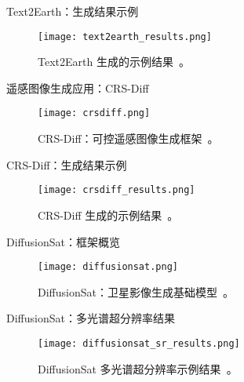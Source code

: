 \begin{refsection}
  \begin{frame}{Text2Earth：生成结果示例}
    \begin{figure}
      \centering
      \texttt{[image: text2earth\_results.png]}
      \caption[]{\scriptsize Text2Earth 生成的示例结果~\parencite{text2earth2025}。}
    \end{figure}
    \bottomleftrefs
  \end{frame}
\end{refsection}

\begin{refsection}
\begin{frame}{遥感图像生成应用：CRS-Diff}
  \begin{figure}
    \centering
    \texttt{[image: crsdiff.png]}
    \caption[]{\scriptsize CRS-Diff：可控遥感图像生成框架~\parencite{tang2024crsdiff}。}
  \end{figure}
  \bottomleftrefs
\end{frame}
\end{refsection}

\begin{refsection}
\begin{frame}{CRS-Diff：生成结果示例}
  \begin{figure}
    \centering
    \texttt{[image: crsdiff\_results.png]}
    \caption[]{\scriptsize CRS-Diff 生成的示例结果~\parencite{tang2024crsdiff}。}
  \end{figure}
  \bottomleftrefs
\end{frame}
\end{refsection}


\begin{refsection}
\begin{frame}{DiffusionSat：框架概览}
  \begin{figure}
    \centering
    \texttt{[image: diffusionsat.png]}
    \caption[]{\scriptsize DiffusionSat：卫星影像生成基础模型~\parencite{diffusionset2024}。}
  \end{figure}
  \bottomleftrefs
\end{frame}
\end{refsection}

\begin{refsection}
\begin{frame}{DiffusionSat：多光谱超分辨率结果}
  \begin{figure}
    \centering
    \texttt{[image: diffusionsat\_sr\_results.png]}
    \caption[]{\scriptsize DiffusionSat 多光谱超分辨率示例结果~\parencite{diffusionset2024}。}
  \end{figure}
  \bottomleftrefs
\end{frame}
\end{refsection}

